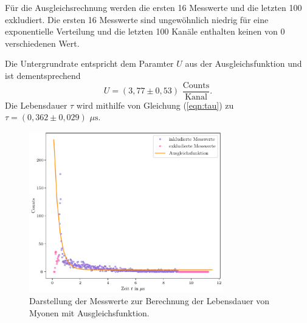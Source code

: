 Für die Ausgleichsrechnung werden 
die ersten 16 Messwerte und die letzten 100 exkludiert. Die ersten 16
Messwerte sind ungewöhnlich niedrig für eine exponentielle Verteilung 
und die letzten 100 Kanäle enthalten keinen von 0 verschiedenen Wert. 

Die Untergrundrate entspricht dem Paramter $U$ aus der Ausgleichsfunktion 
und ist dementsprechend $$U = (3,77 \pm 0,53) \,\, \frac{\text{Counts}}{\text{Kanal}}.$$
Die Lebensdauer $\tau$ wird mithilfe von Gleichung (\ref{eqn:tau}) zu 
$\tau = (0,362 \pm 0,029) \,\, \unit{\mu\second} $.

\begin{figure}
  \centering
  \includegraphics[width=0.75\textwidth]{Lebensdauer_der_Myonen.pdf}
  \caption{Darstellung der Messwerte zur Berechnung der Lebensdauer von Myonen mit Ausgleichsfunktion.}
  \label{fig:Lebensdauer_Myonen}
\end{figure}



